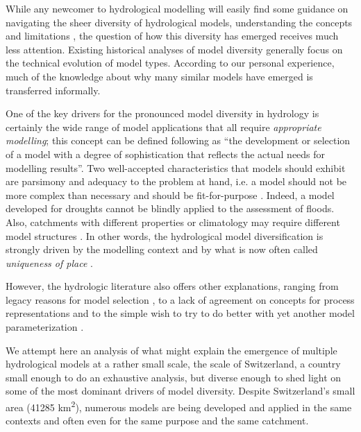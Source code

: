 \documentclass[10pt,a4paper]{article}
\begin{document}
While any newcomer to hydrological modelling will easily find some
guidance on navigating the sheer diversity of hydrological models,
understanding the concepts and limitations \citep{Beven_2013,Solomatine_2011,Kauffeldt_2016}, the
question of how this diversity has emerged receives much less attention.
Existing historical analyses of model diversity \citep{Peel_2020}
generally focus on the technical evolution of model types. According to
our personal experience, much of the knowledge about why many similar
models have emerged is transferred informally.

One of the key drivers for the pronounced model diversity in hydrology
is certainly the wide range of model
applications \citep{Weiler_2015} that all require \textit{appropriate
modelling}; this concept can be defined following \citet{Rosbjerg2005} as
``the development or selection of a model with a degree of
sophistication that reflects the actual needs for modelling results''.
Two well-accepted characteristics that models should exhibit are
parsimony and adequacy to the problem at hand, i.e. a model should not
be more complex than necessary and should be
fit-for-purpose \citep{Beven_2013}. Indeed, a model developed for
droughts cannot be blindly applied to the assessment of floods. Also,
catchments with different properties or climatology may require
different model structures \citep{Kavetski_2011,van_Esse_2013}. In other words, the
hydrological model diversification is strongly driven by the modelling
context and by what is now often called \textit{uniqueness of
place} \citep{Beven_2000}.

However, the hydrologic literature also offers other explanations,
ranging from legacy reasons for model selection \citep{Addor_2019}, to
a lack of agreement on concepts for process representations and to
the simple wish to try to do better with yet another model
parameterization \citep{Weiler_2015}.

We attempt here an analysis of what might explain the emergence of
multiple hydrological models at a rather small scale, the scale of
Switzerland, a country small enough to do an exhaustive analysis, but
diverse enough to shed light on some of the most dominant drivers of
model diversity. Despite Switzerland's small area (41285
km\textsuperscript{2}), numerous models are being developed and applied
in the same contexts and often even for the same purpose and the same
catchment. 
\end{document}
